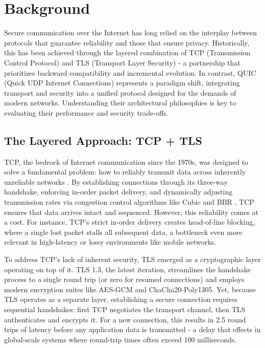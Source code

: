 \section{Background}  
Secure communication over the Internet has long relied on the interplay between protocols that guarantee reliability and those that ensure privacy. Historically, this has been achieved through the layered combination of TCP (Transmission Control Protocol) and TLS (Transport Layer Security) - a partnership that prioritizes backward compatibility and incremental evolution. In contrast, QUIC (Quick UDP Internet Connections) represents a paradigm shift, integrating transport and security into a unified protocol designed for the demands of modern networks. Understanding their architectural philosophies is key to evaluating their performance and security trade-offs.

\subsection{The Layered Approach: TCP + TLS}
TCP, the bedrock of Internet communication since the 1970s, was designed to solve a fundamental problem: how to reliably transmit data across inherently unreliable networks \cite{postel1981rfc0793}. By establishing connections through its three-way handshake, enforcing in-order packet delivery, and dynamically adjusting transmission rates via congestion control algorithms like Cubic and BBR \cite{allman2009tcp, cardwell2016bbr}, TCP ensures that data arrives intact and sequenced. However, this reliability comes at a cost. For instance, TCP's strict in-order delivery creates head-of-line blocking, where a single lost packet stalls all subsequent data, a bottleneck even more relevant in high-latency or lossy environments like mobile networks.
 
To address TCP's lack of inherent security, TLS emerged as a cryptographic layer operating on top of it. TLS 1.3, the latest iteration, streamlines the handshake process to a single round trip (or zero for resumed connections) and employs modern encryption suites like AES-GCM and ChaCha20-Poly1305. Yet, because TLS operates as a separate layer, establishing a secure connection requires sequential handshakes: first TCP negotiates the transport channel, then TLS authenticates and encrypts it. For a new connection, this results in 2.5 round trips of latency before any application data is transmitted - a delay that effects in global-scale systems where round-trip times often exceed 100 milliseconds.

